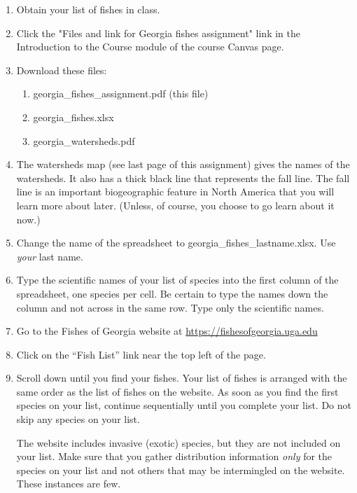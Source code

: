 \documentclass[12pt]{exam}
\begin{document}
\begin{enumerate}
\item
  Obtain your list of fishes in class.
  
\item Click the "Files and link for Georgia fishes assignment" link in the Introduction to the Course module of the course Canvas page. 

\item
  Download these files: 

  \begin{enumerate}
  \def\labelenumii{\arabic{enumii}.}
  
  \item georgia\_fishes\_assignment.pdf (this file)
  \item
    georgia\_fishes.xlsx
  \item
    georgia\_watersheds.pdf
  \end{enumerate}
\item
  The watersheds map (see last page of this assignment) gives 
  the names of the watersheds. It also has a thick black line 
  that represents the fall line. The fall line is an important 
  biogeographic feature in North America that you will learn 
  more about later. (Unless, of course, you choose to go learn 
  about it now.)
\item
  Change the name of the spreadsheet to georgia\_fishes\_lastname.xlsx.
  Use \emph{your} last name.
  
  \newpage
  
\item
  Type the scientific names of your list of species into the first
  column of the spreadsheet, one species per cell. Be certain to 
  type the names down the column and not across in the same row. 
  Type only the scientific names.
\item
  Go to the Fishes of Georgia website at \url{https://fishesofgeorgia.uga.edu}
\item
  Click on the ``Fish List'' link near the top left of the page.
\item
  Scroll down until you find your fishes. Your list of fishes is
  arranged with the same order as the list of fishes on the 
  website. As soon as you find the first species on your list, 
  continue sequentially until you complete your list. Do not skip 
  any species on your list.
  
  The website includes invasive (exotic) species, but they are not included on your list. Make sure that you gather
  distribution information \emph{only} for the species on your list and not 
  others that may be intermingled on the website. These instances 
  are few.
  


\end{enumerate}
\end{document}
